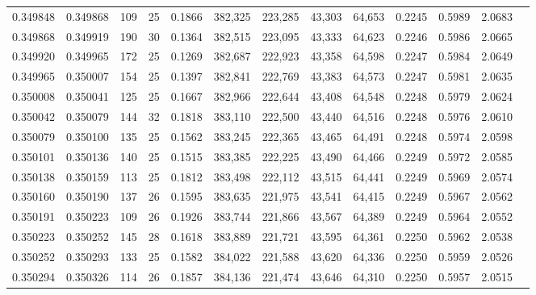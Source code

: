 \begin{tabular}{rrrrrrrrrrrrr}
0.349848 & 0.349868 &   109 &  25 &                                     0.1866 & 382,325 & 223,285 &  43,303 &  64,653 & 0.2245 & 0.5989 & 2.0683 \\
0.349868 & 0.349919 &   190 &  30 &                                     0.1364 & 382,515 & 223,095 &  43,333 &  64,623 & 0.2246 & 0.5986 & 2.0665 \\
0.349920 & 0.349965 &   172 &  25 &                                     0.1269 & 382,687 & 222,923 &  43,358 &  64,598 & 0.2247 & 0.5984 & 2.0649 \\
0.349965 & 0.350007 &   154 &  25 &                                     0.1397 & 382,841 & 222,769 &  43,383 &  64,573 & 0.2247 & 0.5981 & 2.0635 \\
0.350008 & 0.350041 &   125 &  25 &                                     0.1667 & 382,966 & 222,644 &  43,408 &  64,548 & 0.2248 & 0.5979 & 2.0624 \\
0.350042 & 0.350079 &   144 &  32 &                                     0.1818 & 383,110 & 222,500 &  43,440 &  64,516 & 0.2248 & 0.5976 & 2.0610 \\
0.350079 & 0.350100 &   135 &  25 &                                     0.1562 & 383,245 & 222,365 &  43,465 &  64,491 & 0.2248 & 0.5974 & 2.0598 \\
0.350101 & 0.350136 &   140 &  25 &                                     0.1515 & 383,385 & 222,225 &  43,490 &  64,466 & 0.2249 & 0.5972 & 2.0585 \\
0.350138 & 0.350159 &   113 &  25 &                                     0.1812 & 383,498 & 222,112 &  43,515 &  64,441 & 0.2249 & 0.5969 & 2.0574 \\
0.350160 & 0.350190 &   137 &  26 &                                     0.1595 & 383,635 & 221,975 &  43,541 &  64,415 & 0.2249 & 0.5967 & 2.0562 \\
0.350191 & 0.350223 &   109 &  26 &                                     0.1926 & 383,744 & 221,866 &  43,567 &  64,389 & 0.2249 & 0.5964 & 2.0552 \\
0.350223 & 0.350252 &   145 &  28 &                                     0.1618 & 383,889 & 221,721 &  43,595 &  64,361 & 0.2250 & 0.5962 & 2.0538 \\
0.350252 & 0.350293 &   133 &  25 &                                     0.1582 & 384,022 & 221,588 &  43,620 &  64,336 & 0.2250 & 0.5959 & 2.0526 \\
0.350294 & 0.350326 &   114 &  26 &                                     0.1857 & 384,136 & 221,474 &  43,646 &  64,310 & 0.2250 & 0.5957 & 2.0515 \\

\end{tabular}
